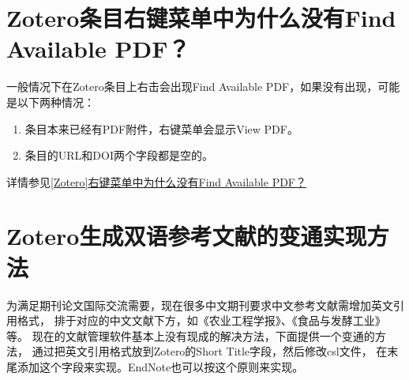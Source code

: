 \documentclass[cn,11pt,chinese]{elegantbook}
\begin{document}
		\section{Zotero条目右键菜单中为什么没有Find Available PDF？}\label{sec:Find_PDF}	
				一般情况下在Zotero条目上右击会出现Find Available PDF，如果没有出现，可能是以下两种情况：
				\begin{enumerate}
					\item 条目本来已经有PDF附件，右键菜单会显示View PDF。
					\item 条目的URL和DOI两个字段都是空的。
				\end{enumerate}
				详情参见\href{https://zhuanlan.zhihu.com/p/348697024}
							{[Zotero]右键菜单中为什么没有Find Available PDF？}
		\section{Zotero生成双语参考文献的变通实现方法}\label{sec:Biolan}
				为满足期刊论文国际交流需要，现在很多中文期刊要求中文参考文献需增加英文引用格式，
				排于对应的中文文献下方，如《农业工程学报》、《食品与发酵工业》等。
				现在的文献管理软件基本上没有现成的解决方法，下面提供一个变通的方法，
				通过把英文引用格式放到Zotero的Short Title字段，然后修改csl文件，
				在末尾添加这个字段来实现。EndNote也可以按这个原则来实现。
\end{document}
